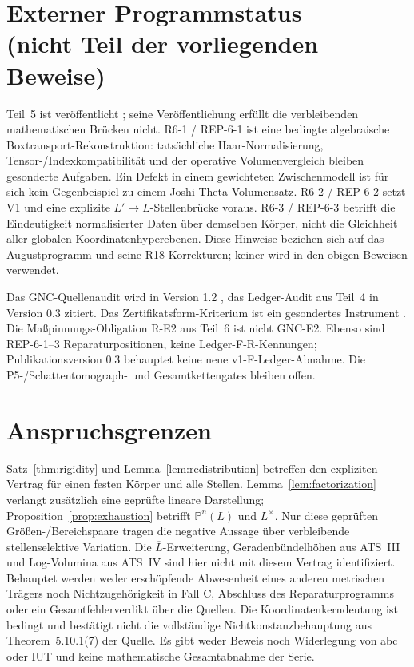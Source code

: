 \documentclass[11pt,a4paper]{article}
\theoremstyle{definition}
\theoremstyle{remark}
\begin{document}
\section[Externer Programmstatus (nicht Teil der vorliegenden Beweise)]{Externer Programmstatus\texorpdfstring{\\}{ }(nicht Teil der vorliegenden Beweise)}\label{sec:notices}

Teil~5 ist veröffentlicht \cite{part5}; seine Veröffentlichung erfüllt
die verbleibenden mathematischen Brücken nicht.
R6-1 / REP-6-1 ist eine bedingte algebraische
Boxtransport-Rekonstruktion: tatsächliche Haar-Normalisierung,
Tensor-/Indexkompatibilität und der operative Volumenvergleich bleiben
gesonderte Aufgaben. Ein Defekt in einem gewichteten Zwischenmodell
ist für sich kein Gegenbeispiel zu einem Joshi-Theta-Volumensatz.
R6-2 / REP-6-2 setzt V1 und eine explizite $L'\to L$-Stellenbrücke voraus.
R6-3 / REP-6-3 betrifft die Eindeutigkeit normalisierter Daten über
demselben Körper, nicht die Gleichheit aller globalen Koordinatenhyperebenen.
Diese Hinweise beziehen sich auf das Augustprogramm und seine
R18-Korrekturen; keiner wird in den obigen Beweisen verwendet.

Das GNC-Quellenaudit wird in Version 1.2 \cite{gnc}, das
Ledger-Audit aus Teil~4 in Version 0.3 \cite{part4} zitiert.
Das Zertifikatsform-Kriterium ist ein gesondertes Instrument \cite{part2}.
Die Maßpinnungs-Obligation R-E2 aus Teil~6 ist nicht GNC-E2.
Ebenso sind REP-6-1--3 Reparaturpositionen, keine Ledger-F-R-Kennungen;
Publikationsversion 0.3 behauptet keine neue v1-F-Ledger-Abnahme.
Die P5-/Schattentomograph- und Gesamtkettengates bleiben offen.

\section{Anspruchsgrenzen}\label{sec:claims}

Satz~\ref{thm:rigidity} und Lemma~\ref{lem:redistribution} betreffen den
expliziten Vertrag für einen festen Körper und alle Stellen.
Lemma~\ref{lem:factorization} verlangt zusätzlich eine geprüfte lineare
Darstellung; Proposition~\ref{prop:exhaustion} betrifft
$\mathbb P^n(L)$ und $L^\times$.
Nur diese geprüften Größen-/Bereichspaare tragen die negative Aussage
über verbleibende stellenselektive Variation.
Die $\overline L$-Erweiterung, Geradenbündelhöhen aus ATS~III und
Log-Volumina aus ATS~IV sind hier nicht mit diesem Vertrag identifiziert.
Behauptet werden weder erschöpfende Abwesenheit eines anderen metrischen
Trägers noch Nichtzugehörigkeit in Fall C, Abschluss des Reparaturprogramms
oder ein Gesamtfehlerverdikt über die Quellen.
Die Koordinatenkerndeutung ist bedingt und bestätigt nicht die vollständige
Nichtkonstanzbehauptung aus Theorem~5.10.1(7) der Quelle.
Es gibt weder Beweis noch Widerlegung von abc oder IUT und keine
mathematische Gesamtabnahme der Serie.
\end{document}
